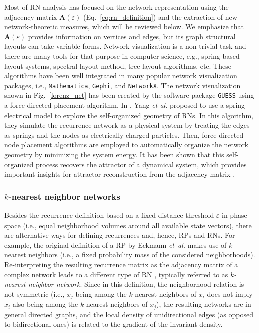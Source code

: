 	 	Most of RN analysis has focused on the network representation using the adjacency matrix $\mathbf{A}(\varepsilon)$ (Eq.~\eqref{eq:rn_definition}) and the extraction of new network-theoretic measures, which will be reviewed below. We emphasize that $\mathbf{A}(\varepsilon)$ provides information on vertices and edges, but its graph structural layouts can take variable forms.  Network visualization is a non-trivial task and there are many tools for that purpose in computer science, e.g., spring-based layout systems, spectral layout method, tree layout algorithms, etc. These algorithms have been well integrated in many popular network visualization packages, i.e., \texttt{Mathematica}, \texttt{Gephi}, and \texttt{NetworkX}. The network visualization shown in Fig.~\ref{lorenz_net} has been created by the software package {\tt{GUESS}} using a force-directed placement algorithm. In \cite{Yang2013}, Yang {\textit{et al.}} proposed to use a spring-electrical model to explore the self-organized geometry of RNs. In this algorithm, they simulate the recurrence network as a physical system by treating the edges as springs and the nodes as electrically charged particles. Then, force-directed node placement algorithms are employed to automatically organize the network geometry by minimizing the system energy. It has been shown that this self-organized process recovers the attractor of a dynamical system, which provides important insights for attractor reconstruction from the adjacency matrix \cite{thiel2004b,hirata2008}.


		\subsubsection{$k$-nearest neighbor networks}
		Besides the recurrence definition based on a fixed distance threshold $\varepsilon$ in phase space (i.e., equal neighborhood volumes around all available state vectors), there are alternative ways for defining recurrences and, hence, RPs and RNs. For example, the original definition of a RP by Eckmann \textit{et~al.} \cite{Eckmann1987} makes use of $k$-nearest neighbors (i.e., a fixed probability mass of the considered neighborhoods). Re-interpreting the resulting recurrence matrix as the adjacency matrix of a complex network leads to a different type of RN \cite{Shimada2008}, typically referred to as \emph{$k$-nearest neighbor network}. Since in this definition, the neighborhood relation is not symmetric (i.e., $x_j$ being among the $k$ nearest neighbors of $x_i$ does not imply $x_i$ also being among the $k$ nearest neighbors of $x_j$), the resulting networks are in general directed graphs, and the local density of unidirectional edges (as opposed to bidirectional ones) is related to the gradient of the invariant density.

